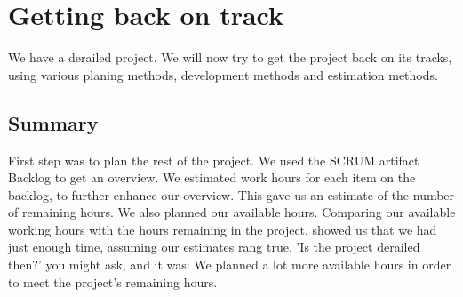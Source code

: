 \section{Getting back on track}
We have a derailed project. We will now try to get the project back on its tracks, using various planing methods, development methods and estimation methods.





\subsection{Summary}
First step was to plan the rest of the project. We used the SCRUM artifact Backlog to get an overview. We estimated work hours for each item on the backlog, to further enhance our overview. This gave us an estimate of the number of remaining hours. We also planned our available hours. Comparing our available working hours with the hours remaining in the project, showed us that we had just enough time, assuming our estimates rang true. 'Is the project derailed then?' you might ask, and it was: We planned a lot more available hours in order to meet the project's remaining hours.
\newpage